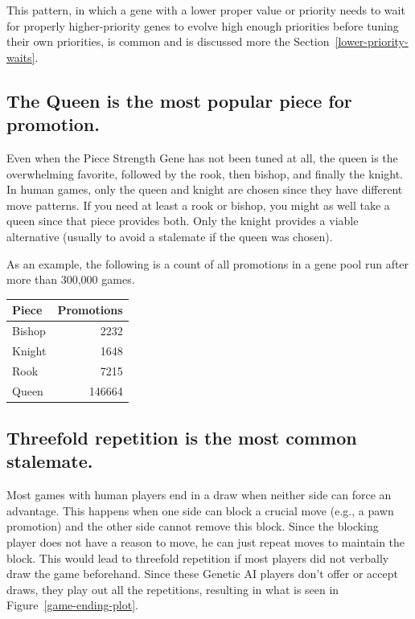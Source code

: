 \documentclass[letterpaper]{article}
\renewcommand{\_}{\allowbreak\textunderscore\allowbreak}
\begin{document}
This pattern, in which a gene with a lower proper value or priority needs to wait for properly higher-priority genes to evolve high enough priorities before tuning their own priorities, is common and is discussed more the Section~\ref{lower-priority-waits}.

\subsection{The Queen is the most popular piece for promotion.}

Even when the Piece Strength Gene has not been tuned at all, the queen is the overwhelming favorite, followed by the rook, then bishop, and finally the knight. In human games, only the queen and knight are chosen since they have different move patterns. If you need at least a rook or bishop, you might as well take a queen since that piece provides both. Only the knight provides a viable alternative (usually to avoid a stalemate if the queen was chosen).

As an example, the following is a count of all promotions in a gene pool run after more than 300,000 games.
\begin{center}
\begin{tabular}{l r}
	Piece & Promotions \\
\toprule
	Bishop & 2232  \\
	Knight  &  1648 \\
	Rook    &  7215 \\
	Queen  & 146664 \\
\end{tabular}
\end{center}


\subsection{Threefold repetition is the most common stalemate.}

Most games with human players end in a draw when neither side can force an advantage. This happens when one side can block a crucial move (e.g., a pawn promotion) and the other side cannot remove this block. Since the blocking player does not have a reason to move, he can just repeat moves to maintain the block. This would lead to threefold repetition if most players did not verbally draw the game beforehand. Since these Genetic AI players don't offer or accept draws, they play out all the repetitions, resulting in what is seen in Figure~\ref{game-ending-plot}.
\end{document}
